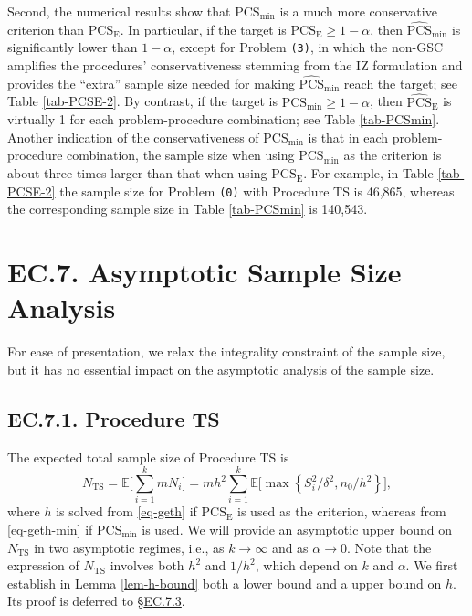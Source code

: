 \documentclass[ijoc,nonblindrev]{informs3}
\def\E{\mathbb{E}}
\def\PCSE{\mathrm{PCS}_{\mathrm{E}}}
\def\APCSE{\widehat{\mathrm{PCS}}_{\mathrm{E}}}
\def\PCSmin{\mathrm{PCS}_{\mathrm{min}}}
\def\APCSmin{\widehat{\mathrm{PCS}}_{\mathrm{min}}}
\begin{document}
Second, the numerical results show that $\PCSmin$ is a much more conservative criterion than $\PCSE$.
In particular, if the target is $\PCSE\geq 1-\alpha$, then $\APCSmin$ is significantly lower than $1-\alpha$, except for Problem \texttt{(3)}, in which the non-GSC amplifies the procedures' conservativeness stemming from the IZ formulation and provides the ``extra'' sample size needed for making $\APCSmin$ reach the target; see Table \ref{tab-PCSE-2}.
By contrast, if the target is $\PCSmin\geq 1-\alpha$, then $\APCSE$ is virtually 1 for each problem-procedure combination; see Table \ref{tab-PCSmin}.
Another indication of the conservativeness of $\PCSmin$ is that in each problem-procedure combination, the sample size when using $\PCSmin$ as the criterion is about three times larger than that when using $\PCSE$.
For example, in Table \ref{tab-PCSE-2} the sample size for Problem \texttt{(0)} with Procedure TS is 46,865, whereas the corresponding sample size in Table \ref{tab-PCSmin} is 140,543.



\hypertarget{EC.7}{
\section*{EC.7. \hspace{5pt} Asymptotic Sample Size Analysis}
}


For ease of presentation, we relax the integrality constraint of the sample size, but it has no essential impact on the asymptotic analysis of the sample size.

\vspace{5pt}
\subsection*{EC.7.1. \hspace{5pt} Procedure TS}
The expected total sample size of Procedure TS is
\begin{equation}\label{expected-sample-size-TS}
    N_{\text{TS}} = \E \bigg[\sum_{i=1}^k mN_i \bigg] = m h^2 \sum_{i=1}^k \E \big[\max \left\{ S_i^2/\delta^2, n_0 / h^2 \right\}\big],
\end{equation}
where $h$ is solved from \eqref{eq-geth} if $\PCSE$ is used as the criterion, whereas from \eqref{eq-geth-min} if $\PCSmin$ is used.
We will provide an asymptotic upper bound on $N_{\text{TS}}$ in two asymptotic regimes, i.e., as $k\to\infty$ and as $\alpha\to 0$.
Note that the expression of $N_{\text{TS}}$ involves both $h^2$ and $1/h^2$, which depend on $k$ and $\alpha$.
We first establish in Lemma \ref{lem-h-bound} both a lower bound and a upper bound on $h$.
Its proof is deferred to \S\hyperlink{EC.7.3}{EC.7.3}.
\end{document}
